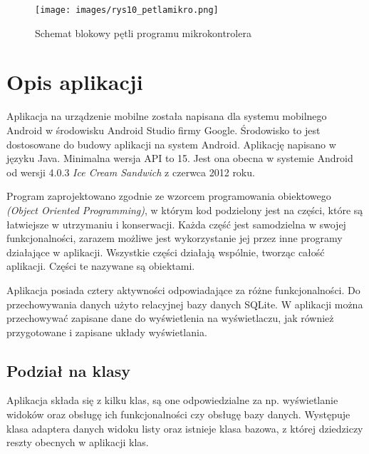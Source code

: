 \documentclass[a4paper,12pt, twoside]{article}
\begin{document}
    	\begin{figure}[H]
    	        \centering
    			\texttt{[image: images/rys10\_petlamikro.png]}
    			\caption{Schemat blokowy pętli programu mikrokontrolera}
                \label{fig:petlamikrokontrolera}
    	\end{figure}
    	
    	\section{Opis aplikacji}
    	Aplikacja na urządzenie mobilne została napisana dla systemu mobilnego Android w środowisku Android Studio firmy Google. Środowisko to jest dostosowane do budowy aplikacji na system Android. Aplikację napisano w języku Java. Minimalna wersja API to 15. Jest ona obecna w systemie Android od wersji 4.0.3 \textit{Ice Cream Sandwich} z czerwca 2012 roku.
    	
    	Program zaprojektowano zgodnie ze wzorcem programowania obiektowego \textit{(Object Oriented Programming)}\cite{oop}, w którym kod podzielony jest na części, które są łatwiejsze w utrzymaniu i konserwacji. Każda część jest samodzielna w swojej funkcjonalności, zarazem możliwe jest wykorzystanie jej przez inne programy działające w aplikacji. Wszystkie części działają wspólnie, tworząc całość aplikacji. Części te nazywane są obiektami. 
    	
    	Aplikacja posiada cztery aktywności odpowiadające za różne funkcjonalności. Do przechowywania danych użyto relacyjnej bazy danych SQLite. W aplikacji można przechowywać zapisane dane do wyświetlenia na wyświetlaczu, jak również przygotowane i zapisane układy wyświetlania.
    	
    	\subsection{Podział na klasy}
    	Aplikacja składa się z kilku klas, są one odpowiedzialne za np. wyświetlanie widoków oraz obsługę ich funkcjonalności czy obsługę bazy danych. Występuje klasa adaptera danych widoku listy oraz istnieje klasa bazowa, z której dziedziczy reszty obecnych w aplikacji klas.
    	
\end{document}
